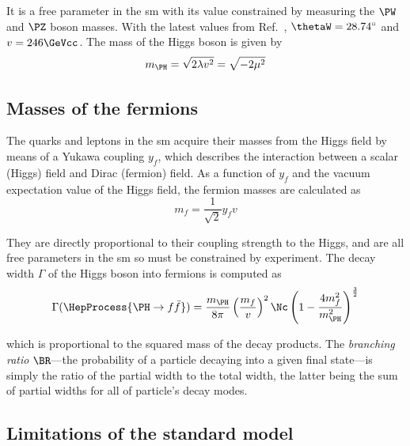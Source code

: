 It is a free parameter in the \acrlong{sm} with its value constrained by measuring the $\PW$ and $\PZ$ boson masses. With the latest values from Ref.~, $\thetaW = \text{28.74}^{\circ}$ and $v = \text{246}\GeVcc$. The mass of the Higgs boson is given by
\begin{equation}
    m_{\PH} = \sqrt{2\lambda v^2} = \sqrt{-2\mu^2}
    \label{eq:higgs_mass}
\end{equation}




\subsection{Masses of the fermions}
\label{subsec:theory_fermion_masses}

The quarks and leptons in the \acrshort{sm} acquire their masses from the Higgs field by means of a Yukawa coupling $y_f$, which describes the interaction between a scalar (Higgs) field and Dirac (fermion) field. As a function of $y_f$ and the vacuum expectation value of the Higgs field, the fermion masses are calculated as
\begin{equation}
    m_f = \frac{1}{\sqrt{2}} y_f v
    \label{eq:fermion_mass}
\end{equation}

They are directly proportional to their coupling strength to the Higgs, and are all free parameters in the \acrshort{sm} so must be constrained by experiment. The decay width $\Gamma$ of the Higgs boson into fermions is computed as
\begin{equation}
    \Gamma(\HepProcess{\PH \to f\bar{f}}) = \frac{m_{\PH}}{8\pi} \left( \frac{m_f}{v} \right)^2 \Nc \left( 1 - \frac{4 m_f^2}{m_{\PH}^2} \right)^{\frac{3}{2}}
    \label{eq:higgs_decay_width_fermions}
\end{equation}

which is proportional to the squared mass of the decay products. The \emph{branching ratio} $\BR$---the probability of a particle decaying into a given final state---is simply the ratio of the partial width to the total width, the latter being the sum of partial widths for all of particle's decay modes.




\subsection{Limitations of the standard model}
\label{subsec:sm_limitations}

